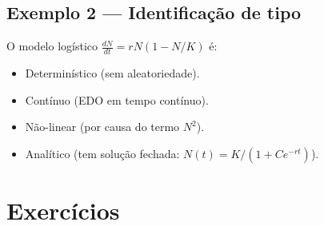 \documentclass[12pt,a4paper]{article}
\begin{document}
\subsection*{Exemplo 2 --- Identifica\c{c}\~ao de tipo}
O modelo log\'istico $\frac{dN}{dt}=rN(1-N/K)$ \'e:
\begin{itemize}
  \item Determin\'istico (sem aleatoriedade).
  \item Cont\'inuo (EDO em tempo cont\'inuo).
  \item N\~ao-linear (por causa do termo $N^2$).
  \item Anal\'itico (tem solu\c{c}\~ao fechada: $N(t) = K/(1 + Ce^{-rt})$).
\end{itemize}

\section*{Exerc\'icios}
\end{document}
